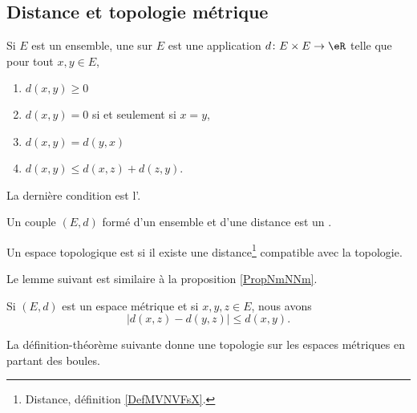\subsection{Distance et topologie métrique}

\begin{definition}  \label{DefMVNVFsX}
	Si \( E\) est un ensemble, une  sur \( E\) est une application \( d\colon E\times E\to \eR\) telle que pour tout \( x,y\in E\),
	\begin{enumerate}

		\item
		      \( d(x,y)\geq 0\)

		\item
		      \( d(x,y)=0\) si et seulement si \( x=y\),

		\item
		      \( d(x,y)=d(y,x)\)

		\item
		      \( d(x,y)\leq d(x,z)+d(z,y)\).

	\end{enumerate}
	La dernière condition est l'.

	Un couple \( (E,d)\) formé d'un ensemble et d'une distance est un .
\end{definition}


\begin{definition}		\label{DEFooGLTUooJjaSmI}
	Un espace topologique est  si il existe une distance\footnote{Distance, définition \ref{DefMVNVFsX}.} compatible avec la topologie.
\end{definition}


Le lemme suivant est similaire à la proposition \ref{PropNmNNm}.
\begin{lemma}		\label{LEMooXCXHooVtrkvl}
	Si \( (E,d)\) est un espace métrique et si \( x,y,z\in E\), nous avons
	\begin{equation}
		| d(x,z)-d(y,z) |\leq d(x,y).
	\end{equation}
\end{lemma}

La définition-théorème suivante donne une topologie sur les espaces métriques en partant des boules.

